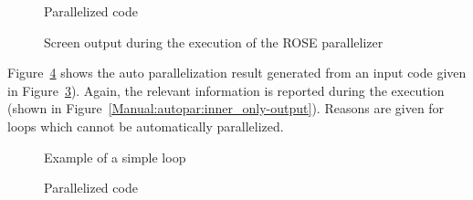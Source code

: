 \begin{figure}[htbp]
{\indent
  {\mySmallFontSize
    \begin{latexonly}
    
    \end{latexonly}
    \begin{htmlonly}
    
    \end{htmlonly}
  }
}
\caption{Parallelized code}
\label{Manual:autopar:doall_2-trans}
\end{figure}

\begin{figure}[htbp]
{\indent
  {\mySmallFontSize
    \begin{latexonly}
    
    \end{latexonly}
    \begin{htmlonly}
    
    \end{htmlonly}
  }
}
\caption{Screen output during the execution of the ROSE parallelizer}
\label{Manual:autopar:doall_2-output}
\end{figure}


Figure~\ref{Manual:autopar:inner_only-trans} shows the auto parallelization result generated from  an input code given in
Figure~\ref{Manual:autopar:inner_only}).
Again, the relevant information is reported during the execution (shown in Figure~\ref{Manual:autopar:inner_only-output}).
Reasons are given for loops which cannot be automatically parallelized. 

\lstset{language=C,basicstyle=\scriptsize,numbers=left}
\begin{figure}[htbp]
{\indent
  {\mySmallFontSize
    \begin{latexonly}
    
    \end{latexonly}
    \begin{htmlonly}
    
    \end{htmlonly}
  }
}
\caption{Example of a simple loop}
\label{Manual:autopar:inner_only}
\end{figure}

\begin{figure}[htbp]
{\indent
  {\mySmallFontSize
    \begin{latexonly}
    
    \end{latexonly}
    \begin{htmlonly}
    
    \end{htmlonly}
  }
}
\caption{Parallelized code}
\label{Manual:autopar:inner_only-trans}
\end{figure}

